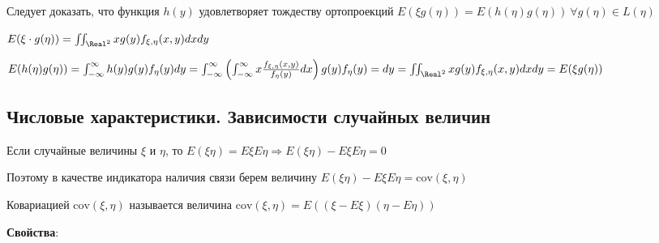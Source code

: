 \documentclass[12pt]{article}
\begin{document}
Следует доказать, что функция $h(y)$ удовлетворяет тождеству ортопроекций $E(\xi g(\eta)) = E(h(\eta)g(\eta)) \ \forall g(\eta) \in L(\eta)$

$E(\xi\cdot g(\eta)) = \iint_{\Real^2} xg(y) f_{\xi,\eta}(x, y)dxdy$

$E(h(\eta)g(\eta)) = \int_{-\infty}^{\infty} h(y) g(y) f_{\eta}(y) dy = \int_{-\infty}^\infty \left(\int_{-\infty}^\infty x\frac{f_{\xi,\eta}(x, y)}{f_\eta(y)}dx\right) g(y) f_\eta(y) = dy = \iint_{\Real^2} xg(y)f_{\xi,\eta}(x, y)dxdy = E(\xi g(\eta))$

\subsection{Числовые характеристики. Зависимости случайных величин}

\Mem Если случайные величины $\xi$ и $\eta$, то $E(\xi\eta) = E\xi E\eta \Longrightarrow E(\xi\eta) - E\xi E\eta = 0$

Поэтому в качестве индикатора наличия связи берем величину $E(\xi\eta) - E\xi E\eta = \mathrm{cov}(\xi, \eta)$

\hypertarget{covariance}{}

\Def Ковариацией $\mathrm{cov}(\xi, \eta)$ называется величина $\mathrm{cov}(\xi, \eta) = E((\xi - E\xi)(\eta - E\eta))$

\mediumvspace

\textbf{Свойства}:
\end{document}

